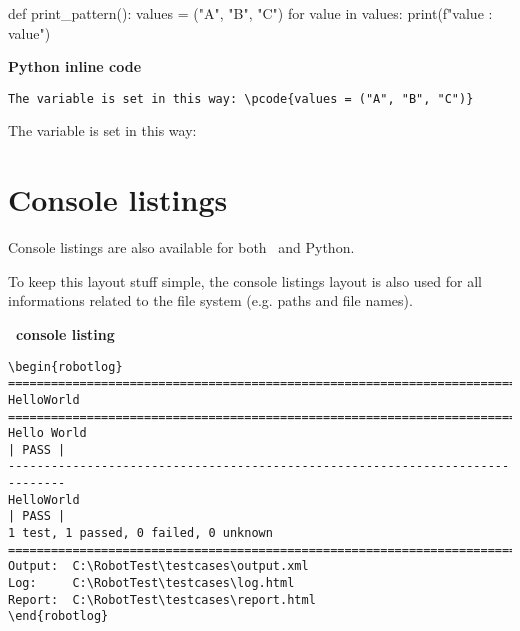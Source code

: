 \documentclass[a4paper,10pt]{report}
\begin{document}
\begin{pythoncode}[caption=Python code example,
                   linebackgroundcolor=\hlcode{1,3}]
def print_pattern():
    values = ("A", "B", "C")
    for value in values:
        print(f"value : {value}")
\end{pythoncode}

\vspace{2ex}

\textbf{Python inline code}
\begin{verbatim}
The variable is set in this way: \pcode{values = ("A", "B", "C")}
\end{verbatim}

The variable is set in this way: 

\newpage

\section{Console listings}

Console listings are also available for both \rfw\ and Python.

To keep this layout stuff simple, the console listings layout is also used for all informations related to the file system (e.g. paths and file names).


\vspace{2ex}

\textbf{\rfw\ console listing}

\begin{verbatim}
\begin{robotlog}
==============================================================================
HelloWorld
==============================================================================
Hello World                                                           | PASS |
------------------------------------------------------------------------------
HelloWorld                                                            | PASS |
1 test, 1 passed, 0 failed, 0 unknown
==============================================================================
Output:  C:\RobotTest\testcases\output.xml
Log:     C:\RobotTest\testcases\log.html
Report:  C:\RobotTest\testcases\report.html
\end{robotlog}
\end{verbatim}
\end{document}
